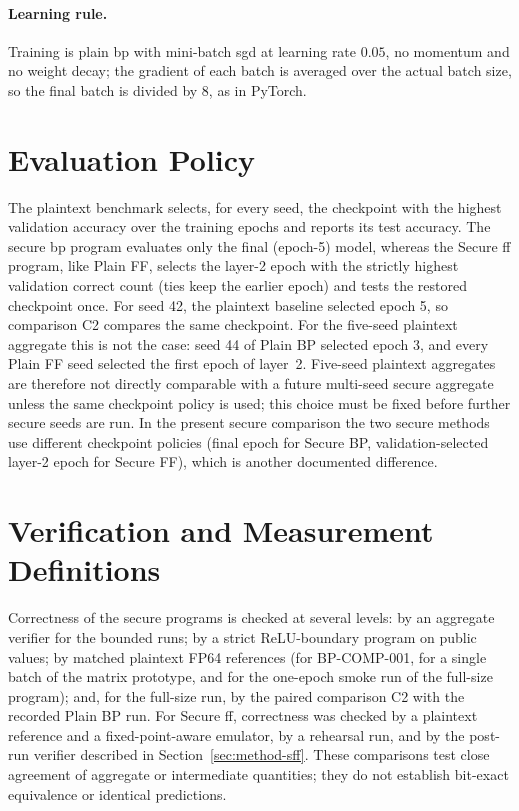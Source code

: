 \paragraph{Learning rule.} Training is plain \ac{bp} with mini-batch \ac{sgd} at learning rate $0.05$, no momentum and no weight decay; the gradient of each batch is averaged over the actual batch size, so the final batch is divided by 8, as in PyTorch.

\section{Evaluation Policy}\label{sec:method-eval}
The plaintext benchmark selects, for every seed, the checkpoint with the highest validation accuracy over the training epochs and reports its test accuracy. The secure \ac{bp} program evaluates only the final (epoch-5) model, whereas the Secure \ac{ff} program, like Plain FF, selects the layer-2 epoch with the strictly highest validation correct count (ties keep the earlier epoch) and tests the restored checkpoint once. For seed 42, the plaintext baseline selected epoch 5, so comparison C2 compares the same checkpoint. For the five-seed plaintext aggregate this is not the case: seed 44 of Plain BP selected epoch 3, and every Plain FF seed selected the first epoch of layer~2. Five-seed plaintext aggregates are therefore not directly comparable with a future multi-seed secure aggregate unless the same checkpoint policy is used; this choice must be fixed before further secure seeds are run. In the present secure comparison the two secure methods use different checkpoint policies (final epoch for Secure BP, validation-selected layer-2 epoch for Secure FF), which is another documented difference.

\section{Verification and Measurement Definitions}\label{sec:method-measure}
Correctness of the secure programs is checked at several levels: by an aggregate verifier for the bounded runs; by a strict ReLU-boundary program on public values; by matched plaintext FP64 references (for BP-COMP-001, for a single batch of the matrix prototype, and for the one-epoch smoke run of the full-size program); and, for the full-size run, by the paired comparison C2 with the recorded Plain BP run. For Secure \ac{ff}, correctness was checked by a plaintext reference and a fixed-point-aware emulator, by a rehearsal run, and by the post-run verifier described in Section~\ref{sec:method-sff}. These comparisons test close agreement of aggregate or intermediate quantities; they do not establish bit-exact equivalence or identical predictions.

